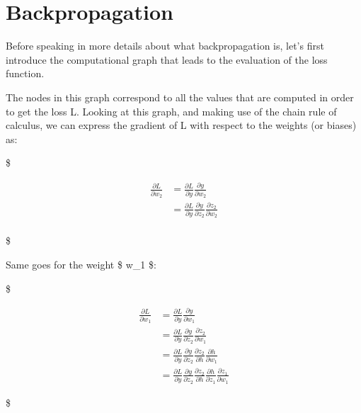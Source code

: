 \documentclass[11pt]{article}
\begin{document}
\section{Backpropagation}\label{backpropagation-1}

Before speaking in more details about what backpropagation is, let's
first introduce the computational graph that leads to the evaluation of
the loss function.

The nodes in this graph correspond to all the values that are computed
in order to get the loss L. Looking at this graph, and making use of the
chain rule of calculus, we can express the gradient of L with respect to
the weights (or biases) as:

\$

\begin{equation} 
    \begin{split}
        \frac{\partial L}{\partial w_2} & = \frac{\partial L}{\partial y} \frac{\partial y}{\partial w_2}\\
                                        & = \frac{\partial L}{\partial y} \frac{\partial y}{\partial z_2} \frac{\partial z_2}{\partial w_2} \\
    \end{split}
\end{equation}

\$

Same goes for the weight \$ w\_1 \$:

\$

\begin{equation} 
    \begin{split}
        \frac{\partial L}{\partial w_1} & = \frac{\partial L}{\partial y} \frac{\partial y}{\partial w_1}\\
                                        & = \frac{\partial L}{\partial y} \frac{\partial y}{\partial z_2} \frac{\partial z_2}{\partial w_1} \\
                                        & = \frac{\partial L}{\partial y} \frac{\partial y}{\partial z_2} \frac{\partial z_2}{\partial h} \frac{\partial h}{\partial w_1} \\
                                        & = \frac{\partial L}{\partial y} \frac{\partial y}{\partial z_2} \frac{\partial z_2}{\partial h} \frac{\partial h}{\partial z_1} \frac{\partial z_1}{\partial w_1}
    \end{split}
\end{equation}

\$
\end{document}

